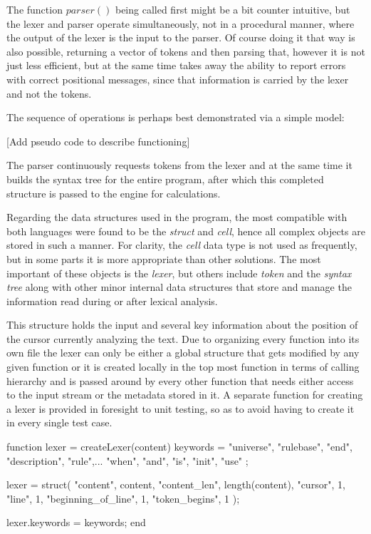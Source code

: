 The function $parser()$ being called first might be a bit counter intuitive, but the lexer and parser operate simultaneously, not in a procedural manner, where the output of the lexer is the input to the parser. Of course doing it that way is also possible, returning a vector of tokens and then parsing that, however it is not just less efficient, but at the same time takes away the ability to report errors with correct positional messages, since that information is carried by the lexer and not the tokens.

The sequence of operations is perhaps best demonstrated via a simple model:

[Add pseudo code to describe functioning]

The parser continuously requests tokens from the lexer and at the same time it builds the syntax tree for the entire program, after which this completed structure is passed to the engine for calculations.

Regarding the data structures used in the program, the most compatible with both languages were found to be the \textit{struct} and \textit{cell}, hence all complex objects are stored in such a manner. For clarity,  the \textit{cell} data type is not used as frequently, but in some parts it is more appropriate than other solutions. The most important of these objects is the \textit{lexer}, but others include \textit{token} and the \textit{syntax tree} along with other minor internal data structures that store and manage the information read during or after lexical analysis.

This structure holds the input and several key information about the position of the cursor currently analyzing the text. Due to organizing every function into its own file the lexer can only be either a global structure that gets modified by any given function or it is created locally in the top most function in terms of calling hierarchy and is passed around by every other function that needs either access to the input stream or the metadata stored in it. A separate function for creating a lexer is provided in foresight to unit testing, so as to avoid having to create it in every single test case.

\begin{octave}
function lexer = createLexer(content)
  keywords = {
    "universe", "rulebase", "end", "description", "rule",...
    "when", "and", "is", "init",  "use"
  };

  lexer = struct(
    "content", content,
    "content_len", length(content),
    "cursor", 1,
    "line", 1,
    "beginning_of_line", 1,
    "token_begins", 1
  );

  lexer.keywords = keywords;
end
\end{octave}

